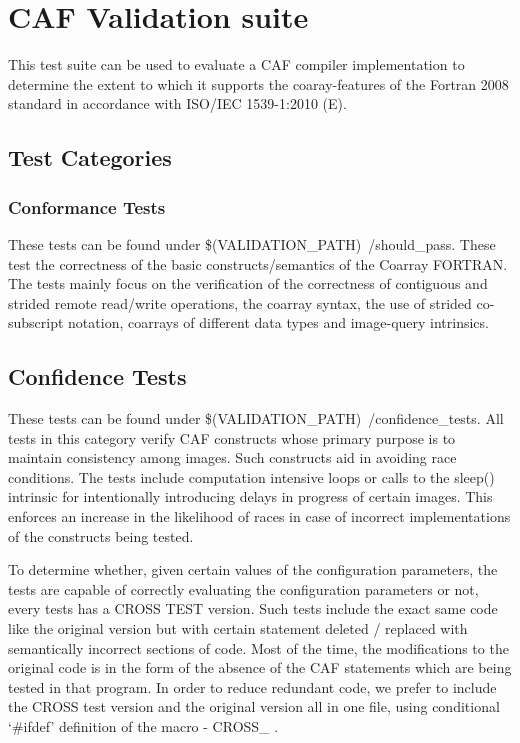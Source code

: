 \section{CAF Validation suite}
This test suite can be used to evaluate a CAF compiler
implementation to determine the extent to which it supports the
coaray-features of the Fortran 2008 standard in accordance with
ISO/IEC 1539-1:2010 (E)\cite{ftn2008}.


\subsection{Test Categories}

\subsubsection{Conformance Tests}

These tests can be found under \$(VALIDATION\_PATH)~/should\_pass.
These test the correctness of the basic constructs/semantics
of the Coarray FORTRAN. The tests mainly focus on the
verification of the correctness of contiguous and strided remote
read/write operations, the coarray syntax, the use of strided
co-subscript notation, coarrays of different data types and
image-query intrinsics.


\subsection{Confidence Tests}
These tests can be found under
\$(VALIDATION\_PATH)~/confidence\_tests. All tests in this
category verify CAF constructs whose primary purpose is to
maintain consistency among images. Such constructs aid in
avoiding race conditions. The tests include computation
intensive loops or calls to the sleep() intrinsic for
intentionally introducing delays in progress of certain images.
This enforces an increase in the likelihood of races in case of
incorrect implementations of the constructs being tested.

To determine whether, given certain values of the configuration
parameters, the tests are capable of correctly evaluating the
configuration parameters or not, every tests has a CROSS TEST
version. Such tests include the exact same code like the
original version but with certain statement deleted / replaced
with semantically incorrect sections of code. Most of the time,
the modifications to the original code is in the form of the
absence of the CAF statements which are being tested in that
program. In order to reduce redundant code, we prefer to include
the CROSS test version and the original version all in one file,
using conditional `\#ifdef' definition of the macro - CROSS\_ .

